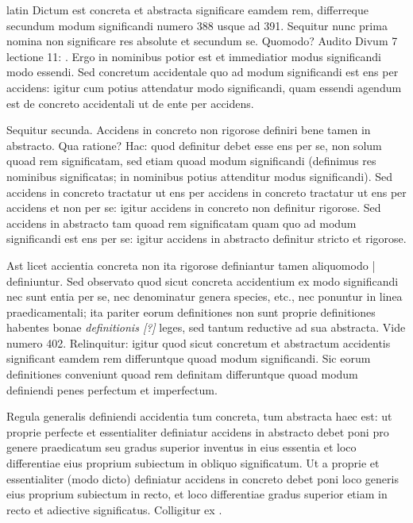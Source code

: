 \begin{otherlanguage*}{latin}
\pstart
  Dictum est concreta et abstracta significare eamdem rem, differreque secundum modum significandi numero 388 usque ad 391. Sequitur nunc prima nomina non significare res absolute et secundum se. Quomodo? Audito  Divum  7  lectione 11: . Ergo in nominibus potior est et immediatior modus significandi modo essendi. Sed concretum accidentale quo ad modum significandi est ens per accidens: igitur cum potius attendatur modo significandi, quam essendi agendum est de concreto accidentali ut de ente per accidens. 
\pend

\pstart
  Sequitur secunda. Accidens in concreto non rigorose definiri bene tamen in abstracto. Qua ratione? Hac: quod definitur debet esse ens per se, non solum quoad rem significatam, sed etiam quoad modum significandi (definimus res nominibus significatas; in nominibus potius attenditur modus significandi). Sed accidens in concreto tractatur ut ens per accidens in concreto tractatur ut ens per accidens et non per se: igitur accidens in concreto non definitur rigorose. Sed accidens in abstracto tam quoad rem significatam quam quo ad modum significandi est ens per se: igitur accidens in abstracto definitur stricto et rigorose. 
\pend

\pstart
  Ast licet accientia concreta non ita rigorose definiantur tamen aliquomodo \textnormal{|} definiuntur. Sed observato quod sicut concreta accidentium ex modo significandi nec sunt entia per se, nec denominatur genera species, etc., nec ponuntur in linea praedicamentali; ita pariter eorum definitiones non sunt proprie definitiones habentes bonae \emph{definitionis [?]} leges, sed tantum reductive ad sua abstracta. Vide numero 402. Relinquitur: igitur quod sicut concretum et abstractum accidentis significant eamdem rem differuntque quoad modum significandi. Sic eorum definitiones conveniunt quoad rem definitam differuntque quoad modum definiendi penes perfectum et imperfectum. 
\pend

\pstart
  Regula generalis definiendi accidentia tum concreta, tum abstracta haec est: ut proprie perfecte et essentialiter definiatur accidens in abstracto debet poni pro genere praedicatum seu gradus superior inventus in eius essentia et loco differentiae eius proprium subiectum in obliquo significatum. Ut a proprie et essentialiter (modo dicto) definiatur accidens in concreto debet poni loco generis eius proprium subiectum in recto, et loco differentiae gradus superior etiam in recto et adiective significatus. Colligitur ex . 
\pend


\end{otherlanguage*}
